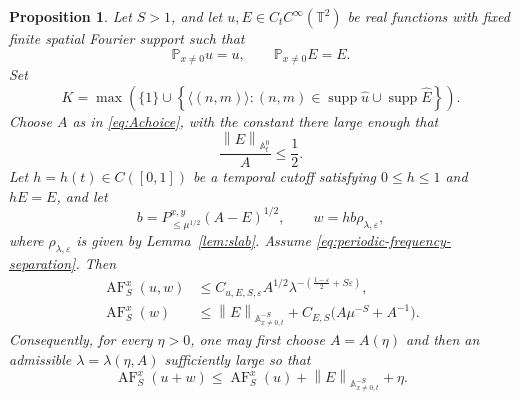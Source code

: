 \documentclass[12pt,reqno,letterpaper]{amsart}
\numberwithin{equation}{section}
\newtheorem{proposition}[theorem]{Proposition}
\theoremstyle{definition}
\newcommand{\T}{\mathbb T}
\newcommand{\A}{\mathbb A}
\newcommand{\eps}{\varepsilon}
\newcommand{\la}{\lambda}
\newcommand{\supp}{\operatorname{supp}}
\newcommand{\norm}[1]{\left\lVert #1\right\rVert}
\begin{document}
\begin{proposition}
\label{prop:periodic-absolute-summability}
Let $S>1$, and let $u,E\in C_tC^\infty(\T^2)$ be real functions with fixed
finite spatial Fourier support such that
\[
   \mathbb P_{x\neq0}u=u,
   \qquad \mathbb P_{x\neq0}E=E.
\]
Set
\[
   K=\max\left(\{1\}\cup\left\{\langle(n,m)\rangle:
       (n,m)\in\supp\widehat u\cup\supp\widehat E\right\}\right).
\]
Choose $A$ as in
\eqref{eq:Achoice}, with the constant there large enough that
\begin{equation}\label{eq:periodic-binomial-smallness}
   \frac{\norm{E}_{\A^0_t}}{A}\leq\frac12.
\end{equation}
Let $h=h(t)\in C([0,1])$ be a temporal cutoff satisfying
$0\leq h\leq1$ and $hE=E$, and let
\[
   b=P_{\leq\mu^{1/2}}^{x,y}(A-E)^{1/2},
   \qquad w=hb\rho_{\la,\eps},
\]
where $\rho_{\la,\eps}$ is given by Lemma~\ref{lem:slab}.  Assume
\eqref{eq:periodic-frequency-separation}.  Then
\begin{align}
    \operatorname{AF}_S^x(u,w)
      &\leq C_{u,E,S,\eps}A^{1/2}
        \la^{-\left(\frac{1-\eps}{2}+S\eps\right)},
      \label{eq:absolute-mixed}\\
    \operatorname{AF}_S^x(w)
      &\leq \norm{E}_{\A^{-S}_{x\neq0,t}}
       +C_{E,S}\bigl(A\mu^{-S}+A^{-1}\bigr).
      \label{eq:absolute-pure}
\end{align}
Consequently, for every $\eta>0$, one may first choose $A=A(\eta)$ and then
an admissible $\la=\la(\eta,A)$ sufficiently large so that
\begin{equation}\label{eq:periodic-AF-step}
   \operatorname{AF}_S^x(u+w)
      \leq\operatorname{AF}_S^x(u)
        +\norm{E}_{\A^{-S}_{x\neq0,t}}+\eta.
\end{equation}
\end{proposition}
\end{document}
